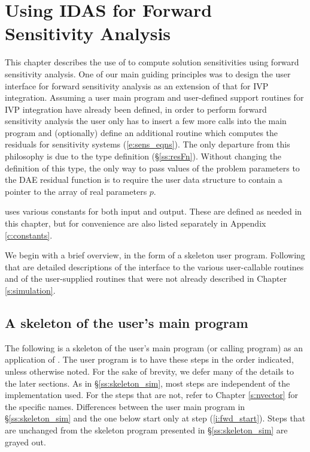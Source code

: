 \chapter{Using IDAS for Forward Sensitivity Analysis}\label{s:forward}

This chapter describes the use of {\idas} to compute solution sensitivities using
forward sensitivity analysis. One of our main guiding principles was to design 
the {\idas} user interface for forward sensitivity analysis as an extension of
that for IVP integration. Assuming a user main program and user-defined support 
routines for IVP integration have already been defined, in order to perform 
forward sensitivity analysis the user only has to insert a few more calls 
into the main program and (optionally) define an additional routine which
computes the residuals for sensitivity systems (\ref{e:sens_eqns}). 
The only departure from this philosophy is due to the  type definition
(\S\ref{ss:resFn}). Without changing the definition of this type, the
only way to pass values of the problem parameters to the DAE residual
function is to require the user data structure  to contain a pointer
to the array of real parameters $p$.

{\idas} uses various constants for both input and output.  These are
defined as needed in this chapter, but for convenience are also listed
separately in Appendix \ref{c:constants}.

We begin with a brief overview, in the form of a skeleton user program.
Following that are detailed descriptions of the interface to the
various user-callable routines and of the user-supplied routines that were not already
described in Chapter \ref{s:simulation}.

\section{A skeleton of the user's main program}\label{s:forward_usage}

The following is a skeleton of the user's main program (or calling
program) as an application of {\idas}. The user program is to have these 
steps in the order indicated, unless otherwise noted.
For the sake of brevity, we defer many of the details to the later sections.
As in \S\ref{ss:skeleton_sim}, most steps are independent of the {\nvector}
implementation used.  For the steps that are not, refer to
Chapter \ref{s:nvector} for the specific names.
Differences between the user main program in \S\ref{ss:skeleton_sim} and
the one below start only at step (\ref{i:fwd_start}).
Steps that are unchanged from the skeleton program presented in
\S\ref{ss:skeleton_sim} are grayed out.

